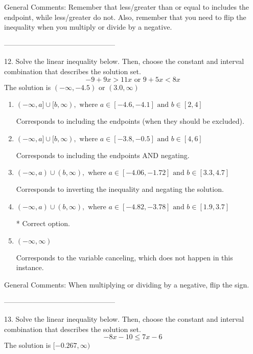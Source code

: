 \documentclass{extbook}[14pt]
\begin{document}
General Comments: Remember that less/greater than or equal to includes the endpoint, while less/greater do not. Also, remember that you need to flip the inequality when you multiply or divide by a negative.

-----------------------------------------------

12. Solve the linear inequality below. Then, choose the constant and interval combination that describes the solution set.
\[ -9 + 9 x > 11 x \text{ or } 9 + 5 x < 8 x \] 
The solution is $ (-\infty, -4.5) \text{ or } (3.0, \infty) $ 

\begin{enumerate}[label=\Alph*.] 
\item $ (-\infty, a] \cup [b, \infty), \text{ where } a \in [-4.6, -4.1] \text{ and } b \in [2, 4] $ 

 Corresponds to including the endpoints (when they should be excluded). 
\item $ (-\infty, a] \cup [b, \infty), \text{ where } a \in [-3.8, -0.5] \text{ and } b \in [4, 6] $ 

 Corresponds to including the endpoints AND negating. 
\item $ (-\infty, a) \cup (b, \infty), \text{ where } a \in [-4.06, -1.72] \text{ and } b \in [3.3, 4.7] $ 

 Corresponds to inverting the inequality and negating the solution. 
\item $ (-\infty, a) \cup (b, \infty), \text{ where } a \in [-4.82, -3.78] \text{ and } b \in [1.9, 3.7] $ 

  * Correct option. 
\item $ (-\infty, \infty) $ 

 Corresponds to the variable canceling, which does not happen in this instance. 
\end{enumerate} 
 
General Comments: When multiplying or dividing by a negative, flip the sign.

-----------------------------------------------

13. Solve the linear inequality below. Then, choose the constant and interval combination that describes the solution set.
\[ -8x -10 \leq 7x -6 \] 
The solution is $ [-0.267, \infty) $ 
\end{document}
